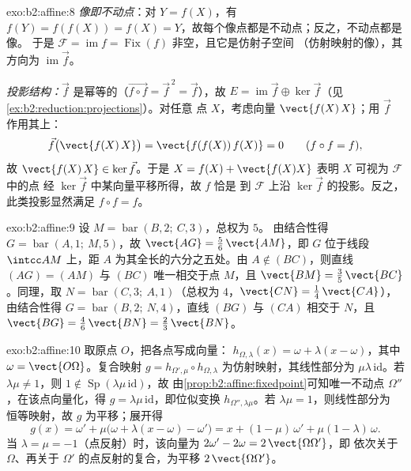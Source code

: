 \begin{solution}{exo:b2:affine:8}
\emph{像即不动点}：对 $Y = f(X)$，有 $f(Y) = f(f(X)) =
f(X) = Y$，故每个像点都是不动点；反之，不动点都是像。
于是 $\mathcal{F} = \operatorname{im} f =
\operatorname{Fix}(f)$ 非空，且它是仿射子空间
（仿射映射的像），其方向为 $\operatorname{im}\vec f$。

\emph{投影结构：}$\vec f$ 是幂等的（$\vec{f\circ
f} = \vec f^{\,2} = \vec f$），故 $E = \operatorname{im}\vec f
\oplus \ker \vec f$（见\cref{ex:b2:reduction:projections}）。对任意
点 $X$，考虑向量 $\vect{f(X)\,X}$；用 $\vec f$ 作用其上：
\[
\vec f\bigl(\vect{f(X)\,X}\bigr) = \vect{f(f(X))\,f(X)} = 0
\qquad (f \circ f = f),
\]
故 $\vect{f(X)\,X} \in \ker\vec f$。于是 $X = f(X) +
\vect{f(X)X}$ 表明 $X$ 可视为 $\mathcal{F}$ 中的点
经 $\ker\vec f$ 中某向量平移所得，故 $f$ 恰是
到 $\mathcal{F}$ 上沿 $\ker\vec f$ 的投影。反之，
此类投影显然满足 $f \circ f = f$。
\end{solution}

\begin{solution}{exo:b2:affine:9}
设 $M = \operatorname{bar}(B, 2;\ C, 3)$，总权为 $5$。
由结合性得 $G = \operatorname{bar}(A, 1;\ M, 5)$，故
$\vect{AG} = \frac56\,\vect{AM}$，即 $G$ 位于线段
$\intcc AM$ 上，距 $A$ 为其全长的六分之五处。由 $A \notin
(BC)$，则直线 $(AG) = (AM)$ 与 $(BC)$ 唯一相交于点
$M$，且 $\vect{BM} = \frac35\,\vect{BC}$。同理，取 $N =
\operatorname{bar}(C, 3;\ A, 1)$（总权为 $4$，$\vect{CN}
= \frac14\,\vect{CA}$），由结合性得 $G =
\operatorname{bar}(B, 2;\ N, 4)$，直线 $(BG)$ 与 $(CA)$ 相交于
$N$，且 $\vect{BG} = \frac46\,\vect{BN} =
\frac23\,\vect{BN}$。
\end{solution}

\begin{solution}{exo:b2:affine:10}
取原点 $O$，把各点写成向量：
$h_{\Omega, \lambda}(x) = \omega + \lambda(x - \omega)$，其中
$\omega = \vect{O\Omega}$。复合映射 $g = h_{\Omega',
\mu} \circ h_{\Omega, \lambda}$ 为仿射映射，其线性部分为
$\mu\lambda\,\mathrm{id}$。若 $\lambda\mu \neq 1$，则 $1 \notin
\operatorname{Sp}(\lambda\mu\,\mathrm{id})$，故
由\cref{prop:b2:affine:fixedpoint}可知唯一不动点
$\Omega''$，在该点向量化，得 $g =
\lambda\mu\,\mathrm{id}$，即位似变换 $h_{\Omega'',
\lambda\mu}$。若 $\lambda\mu = 1$，则线性部分为
恒等映射，故 $g$ 为平移；展开得
\[
g(x) = \omega' + \mu\bigl(\omega + \lambda(x - \omega) -
\omega'\bigr) = x + (1 - \mu)\,\omega' + \mu(1 -
\lambda)\,\omega .
\]
当 $\lambda = \mu = -1$（点反射）时，该向量为
$2\omega' - 2\omega = 2\,\vect{\Omega\Omega'}$，即
依次关于 $\Omega$、再关于
$\Omega'$ 的点反射的复合，为平移 $2\,\vect{\Omega\Omega'}$。
\end{solution}

